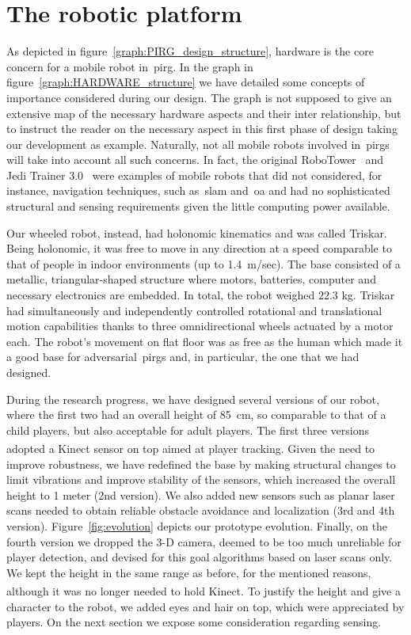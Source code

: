 \section{The robotic platform}\label{sec:roboplat} 
As depicted in figure~\ref{graph:PIRG_design_structure}, hardware is the core concern for a mobile robot in~\gls{pirg}. In the graph in figure~\ref{graph:HARDWARE_structure} we have detailed some concepts of importance considered during our design. The graph is not supposed to give an extensive map of the necessary hardware aspects and their inter relationship, but to instruct the reader on the necessary aspect in this first phase of design taking our development as example. Naturally, not all mobile robots involved in~\gls{pirg}s will take into account all such concerns. In fact, the original RoboTower~\citep{bonarini_timing_2014} and Jedi Trainer 3.0~\citep{martinoia_physically_2013} were examples of mobile robots that did not considered, for instance, navigation techniques, such as~\gls{slam} and~\gls{oa} and had no sophisticated structural and sensing requirements given the little computing power available.

Our wheeled robot, instead, had holonomic kinematics and was called Triskar. Being holonomic, it was free to move in any direction at a speed comparable to that of people in indoor environments (up to 1.4~m/sec). The base consisted of a metallic, triangular-shaped structure where motors, batteries, computer and necessary electronics are embedded. In total, the robot weighed $22.3$ kg. Triskar had simultaneously and independently controlled rotational and translational motion capabilities thanks to three omnidirectional wheels actuated by a motor each. The robot's movement on flat floor was as free as the human which made it a good base for adversarial~\gls{pirg}s and, in particular, the one that we had designed. 



During the research progress, we have designed several versions of our robot, where the first two had an overall height of 85~cm, so comparable to that of a child players, but also acceptable for adult players. The first three versions adopted a Kinect\textsuperscript{\textregistered} sensor on top aimed at player tracking. Given the need to improve robustness, we have redefined the base by making structural changes to limit vibrations and improve stability of the sensors, which increased the overall height to 1 meter (2nd version). We also added new sensors such as planar laser scans needed to obtain reliable obstacle avoidance and localization (3rd and 4th version). Figure~\ref{fig:evolution} depicts our prototype evolution. Finally, on the fourth version we dropped the 3-D camera, deemed to be too much unreliable for player detection, and devised for this goal algorithms based on laser scans only. We kept the height in the same range as before, for the mentioned reasons, although it was no longer needed to hold Kinect\textsuperscript{\textregistered}. To justify the height and give a character to the robot, we added eyes and hair on top, which were appreciated by players. On the next section we expose some consideration regarding sensing.

